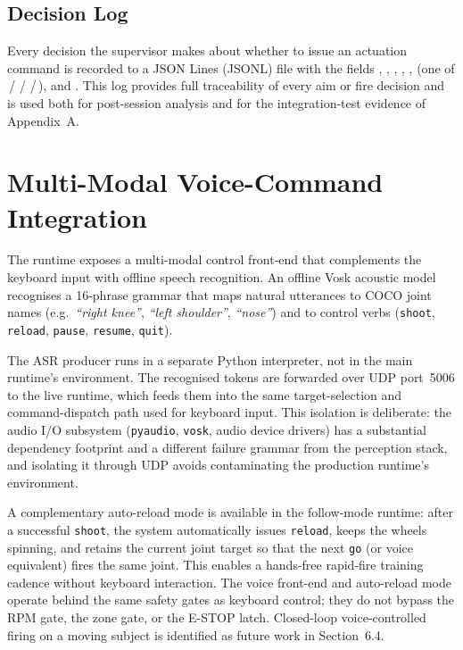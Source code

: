 \subsection{Decision Log}

Every decision the supervisor makes about whether to issue an actuation command is recorded to a JSON Lines (JSONL) file with the fields , , , , ,  (one of \,/\,\,/\,\,/\,), and . This log provides full traceability of every aim or fire decision and is used both for post-session analysis and for the integration-test evidence of Appendix~A.

\section{Multi-Modal Voice-Command Integration}

The runtime exposes a multi-modal control front-end that complements the keyboard input with offline speech recognition. An offline Vosk \cite{ref41_vosk} acoustic model recognises a 16-phrase grammar that maps natural utterances to COCO joint names (e.g.\ \textit{``right knee''}, \textit{``left shoulder''}, \textit{``nose''}) and to control verbs (\texttt{shoot}, \texttt{reload}, \texttt{pause}, \texttt{resume}, \texttt{quit}).

The ASR producer runs in a separate Python interpreter, not in the main runtime's environment. The recognised tokens are forwarded over UDP port~5006 to the live runtime, which feeds them into the same target-selection and command-dispatch path used for keyboard input. This isolation is deliberate: the audio I/O subsystem (\texttt{pyaudio}, \texttt{vosk}, audio device drivers) has a substantial dependency footprint and a different failure grammar from the perception stack, and isolating it through UDP avoids contaminating the production runtime's environment.

A complementary auto-reload mode is available in the follow-mode runtime: after a successful \texttt{shoot}, the system automatically issues \texttt{reload}, keeps the wheels spinning, and retains the current joint target so that the next \texttt{go} (or voice equivalent) fires the same joint. This enables a hands-free rapid-fire training cadence without keyboard interaction. The voice front-end and auto-reload mode operate behind the same safety gates as keyboard control; they do not bypass the RPM gate, the zone gate, or the E-STOP latch. Closed-loop voice-controlled firing on a moving subject is identified as future work in Section~6.4.

